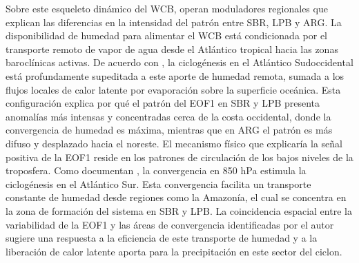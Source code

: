 Sobre este esqueleto dinámico del WCB, operan moduladores regionales que explican las diferencias en la intensidad del patrón entre SBR, LPB y ARG. La disponibilidad de humedad para alimentar el WCB está condicionada por el transporte remoto de vapor de agua desde el Atlántico tropical hacia las zonas baroclínicas activas. De acuerdo con \citet{gozzo2017climatology}, la ciclogénesis en el Atlántico Sudoccidental está profundamente supeditada a este aporte de humedad remota, sumada a los flujos locales de calor latente por evaporación sobre la superficie oceánica. Esta configuración explica por qué el patrón del EOF1 en SBR y LPB presenta anomalías más intensas y concentradas cerca de la costa occidental, donde la convergencia de humedad es máxima, mientras que en ARG el patrón es más difuso y desplazado hacia el noreste.
%
%
El mecanismo físico que explicaría la señal positiva de la EOF1 reside en los patrones de circulación de los bajos niveles de la troposfera. Como documentan \citet{rocha2016estudo}, la convergencia en 850 hPa estimula la ciclogénesis en el Atlántico Sur. Esta convergencia facilita un transporte constante de humedad desde regiones como la Amazonía, el cual se concentra en la zona de formación del sistema en SBR y LPB. La coincidencia espacial entre la variabilidad de la EOF1 y las áreas de convergencia identificadas por el autor sugiere una respuesta a la eficiencia de este transporte de humedad y a la liberación de calor latente aporta para la precipitación en este sector del ciclon.

